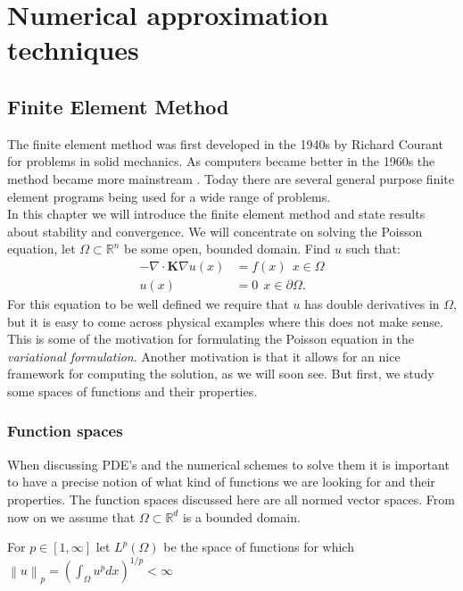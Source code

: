 \documentclass[../Main/main.tex]{subfiles}
\begin{document}
	\graphicspath{{../Discretization/figs/}}
	\chapter{Numerical approximation techniques}
	\section*{Finite Element Method}
	The finite element method was first developed in the 1940s by Richard Courant for problems in solid mechanics. As computers became better in the 1960s the method became  more mainstream \cite{Stein2014}. Today there are several general purpose finite element programs being used for a wide range of problems.\\
	In this chapter we will introduce the finite element method and state results about stability and convergence.
	We will concentrate on solving the Poisson equation, let $\Omega \subset \mathbb{R}^n$ be some open, bounded domain. Find $u$ such that:
	\begin{equation} \label{eq:poisson}
		\begin{split}
			-\nabla \cdot \bm{K} \nabla u(x) &= f(x) \ \  x\in \Omega \\ 
			u(x) &= 0 \ \ x\in \partial \Omega.
		\end{split}
	\end{equation}
	For this equation to be well defined we require that $u$ has double derivatives in $\Omega$, but it is easy to come across physical examples where this does not make sense.
	This is some of the motivation for formulating the Poisson equation in the \emph{variational formulation}. Another motivation is that it allows for an nice framework for computing the solution, as we will soon see. But first, we study some spaces of functions and their properties.
	
	
	\subsection*{Function spaces}
	When discussing PDE's and the numerical schemes to solve them it is important to have a precise notion of what kind of functions we are looking for and their properties. The function spaces discussed here are all normed vector spaces. From now on we assume that $\Omega \subset \mathbb{R}^d$ is a bounded domain.
	\begin{definition}
		For $p\in [1,\infty]$ let $L^p(\Omega)$ be the space of functions for which  $\left \| u \right \|_p = (\int_{\Omega} u^pdx)^{1/p} <\infty$
	\end{definition}
\end{document}
